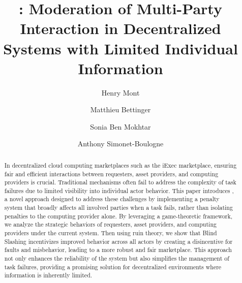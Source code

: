 \documentclass[sigplan,10pt,anonymous,review,nonacm]{acmart}
\begin{document}
\title{\sysname: Moderation of Multi-Party Interaction in Decentralized Systems with Limited Individual Information}

\author{Henry Mont}

\author{Matthieu Bettinger}

\author{Sonia Ben Mokhtar}


\author{Anthony Simonet-Boulogne}

\renewcommand{\shortauthors}{Mont et al.}

\begin{abstract}
  In decentralized cloud computing marketplaces such as the iExec marketplace, ensuring fair and efficient interactions between requesters, asset providers, and computing providers is crucial. 
  Traditional mechanisms often fail to address the complexity of task failures due to limited visibility into individual actor behavior. 
  This paper introduces \sysname, a novel approach designed to address these challenges by implementing a penalty system that broadly affects all involved parties when a task fails, rather than isolating penalties to the computing provider alone. 
  By leveraging a game-theoretic framework, we analyze the strategic behaviors of requesters, asset providers, and computing providers under the current system. 
  Then using ruin theory, we show that Blind Slashing incentivizes improved behavior across all actors by creating a disincentive for faults and misbehavior, leading to a more robust and fair marketplace. 
  This approach not only enhances the reliability of the system but also simplifies the management of task failures, providing a promising solution for decentralized environments where information is inherently limited.
\end{abstract}
\end{document}
